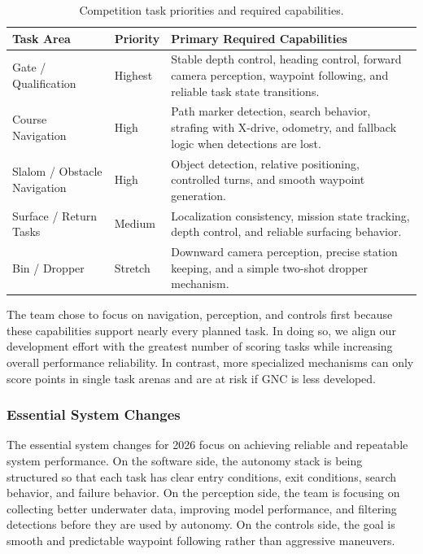 \documentclass[conference]{IEEEtran}
\begin{document}
\begin{table}[htbp]
\caption{Competition task priorities and required capabilities.}
\label{tab:task_alignment}
\begin{center}
\begin{tabularx}{\columnwidth}{|p{}|p{}|X|}
\hline
\textbf{Task Area} & \textbf{Priority} & \textbf{Primary Required Capabilities} \\
\hline
Gate / Qualification & Highest & Stable depth control, heading control, forward camera perception, waypoint following, and reliable task state transitions. \\
\hline
Course Navigation & High & Path marker detection, search behavior, strafing with X-drive, odometry, and fallback logic when detections are lost. \\
\hline
Slalom / Obstacle Navigation & High & Object detection, relative positioning, controlled turns, and smooth waypoint generation. \\
\hline
Surface / Return Tasks & Medium & Localization consistency, mission state tracking, depth control, and reliable surfacing behavior. \\
\hline
Bin / Dropper & Stretch & Downward camera perception, precise station keeping, and a simple two-shot dropper mechanism. \\
\hline
\end{tabularx}
\end{center}
\end{table}

The team chose to focus on navigation, perception, and controls first because these capabilities support nearly every planned task. In doing so, we align our development effort with the greatest number of scoring tasks while increasing overall performance reliability. In contrast, more specialized mechanisms can only score points in single task arenas and are at risk if GNC is less developed.

\subsubsection{Essential System Changes}

The essential system changes for 2026 focus on achieving reliable and repeatable system performance. On the software side, the autonomy stack is being structured so that each task has clear entry conditions, exit conditions, search behavior, and failure behavior. On the perception side, the team is focusing on collecting better underwater data, improving model performance, and filtering detections before they are used by autonomy. On the controls side, the goal is smooth and predictable waypoint following rather than aggressive maneuvers.
\end{document}
